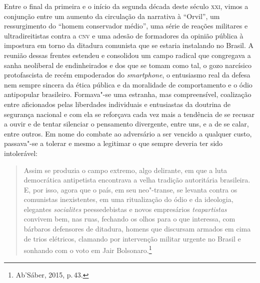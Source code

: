 Entre o final da primeira e o início da segunda década deste século \textsc{xxi},
vimos a conjunção entre um aumento da circulação da narrativa à
``Orvil'', um ressurgimento do ``homem conservador médio'', uma série de
reações militares e ultradireitistas contra a \textsc{cnv} e uma adesão de
formadores da opinião pública à impostura em torno da ditadura comunista
que se estaria instalando no Brasil. A reunião dessas frentes estendeu e
consolidou um campo radical que congregava a sanha neoliberal de
endinheirados e dos que se tomam como tal, o gozo narcísico
protofascista de recém empoderados do \emph{smartphone}, o entusiasmo
real da defesa nem sempre sincera da ética pública e da moralidade de
comportamento e o ódio antipopular brasileiro. Formava"-se uma estranha,
mas compreensível, coalização entre aficionados pelas liberdades
individuais e entusiastas da doutrina de segurança nacional e com ela se
reforçava cada vez mais a tendência de se recusar a ouvir e de tentar
silenciar o pensamento divergente, entre uns, e a de se calar, entre
outros. Em nome do combate ao adversário a ser vencido a qualquer custo,
passava"-se a tolerar e mesmo a legitimar o que sempre deveria ter sido
intolerável:

\begin{quote}
Assim se produzia o campo extremo, algo delirante, em que a luta
democrática antipetista encontrava a velha tradição autoritária
brasileira. E, por isso, agora que o país, em seu neo"-transe, se levanta
contra os comunistas inexistentes, em uma ritualização do ódio e da
ideologia, elegantes \emph{socialites} peessedebistas e novos
empresários \emph{teapartistas} convivem bem, nas ruas, fechando os
olhos para o que interessa, com bárbaros defensores de ditadura, homens
que discursam armados em cima de trios elétricos, clamando por
intervenção militar urgente no Brasil e sonhando com o voto em Jair
Bolsonaro.\footnote{Ab'Sáber, 2015, p.\,43.}
\end{quote}

